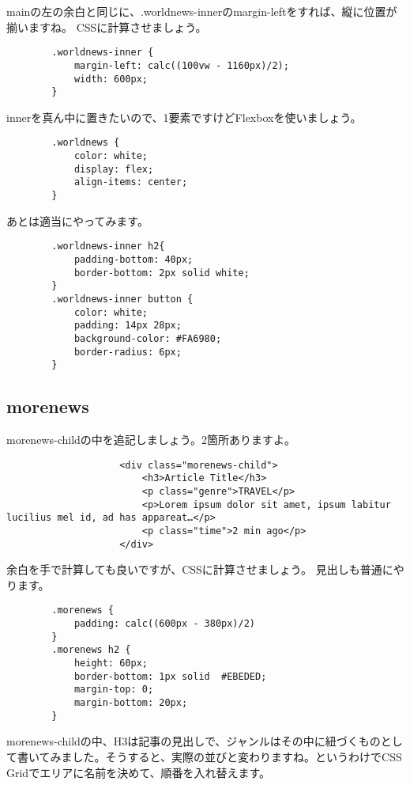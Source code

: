 \documentclass[mingoth,11pt,a4j,uplatex,dvipdfmx]{jsarticle}
\begin{document}
mainの左の余白と同じに、.worldnews-innerのmargin-leftをすれば、縦に位置が揃いますね。
CSSに計算させましょう。

\begin{lstlisting}
        .worldnews-inner {
            margin-left: calc((100vw - 1160px)/2);
            width: 600px;
        }
\end{lstlisting}

innerを真ん中に置きたいので、1要素ですけどFlexboxを使いましょう。

\begin{lstlisting}
        .worldnews {
            color: white;
            display: flex;
            align-items: center;
        }
\end{lstlisting}

あとは適当にやってみます。

\begin{lstlisting}
        .worldnews-inner h2{
            padding-bottom: 40px;
            border-bottom: 2px solid white;
        }
        .worldnews-inner button {
            color: white;
            padding: 14px 28px;
            background-color: #FA6980;
            border-radius: 6px;
        }
\end{lstlisting}

\subsection{morenews}
morenews-childの中を追記しましょう。2箇所ありますよ。

\begin{lstlisting}
                    <div class="morenews-child">
                        <h3>Article Title</h3>
                        <p class="genre">TRAVEL</p>
                        <p>Lorem ipsum dolor sit amet, ipsum labitur lucilius mel id, ad has appareat…</p>
                        <p class="time">2 min ago</p>
                    </div>
\end{lstlisting}

余白を手で計算しても良いですが、CSSに計算させましょう。
見出しも普通にやります。
\begin{lstlisting}
        .morenews {
            padding: calc((600px - 380px)/2)
        }
        .morenews h2 {
            height: 60px;
            border-bottom: 1px solid  #EBEDED;
            margin-top: 0;
            margin-bottom: 20px;
        }
\end{lstlisting}

morenews-childの中、H3は記事の見出しで、ジャンルはその中に紐づくものとして書いてみました。そうすると、実際の並びと変わりますね。というわけでCSS Gridでエリアに名前を決めて、順番を入れ替えます。
\end{document}
